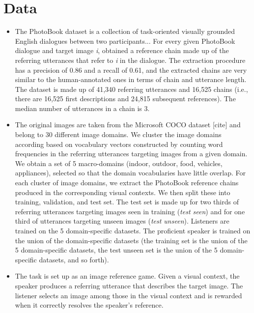 
\section{Data}
\label{sec:data}

\begin{itemize}
\item The PhotoBook dataset \citep{haber2019photobook} is a collection of task-oriented visually grounded English dialogues between two participants...
For every given PhotoBook dialogue and target image \emph{i}, \citet{takmaz-etal-2020-refer} obtained a reference chain made up of the referring utterances that refer to \emph{i} in the dialogue. The extraction procedure has a precision of 0.86 and a recall of 0.61, and the extracted chains are very similar to the human-annotated ones in terms of chain and utterance length. The dataset is made up of 41,340 referring utterances and 16,525 chains (i.e., there are 16,525 first descriptions and 24,815 subsequent references). The median number of utterances in a chain is 3.
\item The original images are taken from the Microsoft COCO dataset [cite] and belong to 30 different image domains. We cluster the image domains according based on vocabulary vectors constructed by counting word frequencies in the referring utterances targeting images from a given domain. We obtain a set of 5 macro-domains (indoor, outdoor, food, vehicles, appliances), selected so that the domain vocabularies have little overlap. 
For each cluster of image domains, we extract the PhotoBook reference chains produced in the corresponding visual contexts. We then split these into training, validation, and test set. The test set is made up for two thirds of referring utterances targeting images seen in training (\textit{test seen}) and for one third of utterances targeting unseen images (\textit{test unseen}). 
Listeners are trained on the 5 domain-specific datasets. The proficient speaker is trained on the union of the domain-specific datasets (the training set is the union of the 5 domain-specific datasets, the test unseen set is the union of the 5 domain-specific datasets, and so forth).
\item The task is set up as an image reference game. Given a visual context, the speaker produces a referring utterance that describes the target image. The listener selects an image among those in the visual context and is rewarded when it correctly resolves the speaker's reference.
\end{itemize}



